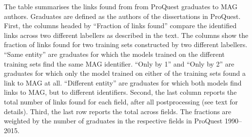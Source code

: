 \begin{table}
\begin{threeparttable}
\begin{tablenotes}[para]
\item The table summarises the links found from from ProQuest graduates to MAG authors. Graduates are defined as the authors of the dissertations in ProQuest. First, the columns headed by ``Fraction of links found'' compare the identified links across two different labellers as described in the text. The columns show the fraction of links found for two training sets constructed by two different labellers. ``Same entity'' are graduates for which the models trained on the different training sets find the same MAG identifier. ``Only by 1'' and ``Only by 2'' are graduates for which only the model trained on either of the training sets found a link to MAG at all. ``Different entity'' are graduates for which both models find links to MAG, but to different identifiers. Second, the last column reports the total number of links found for each field, after all postprocessing (see text for details). Third, the last row reports the total across fields. The fractions are weighted by the number of graduates in the respective fields in ProQuest 1990--2015.
\end{tablenotes}
\end{threeparttable}
\end{table}
